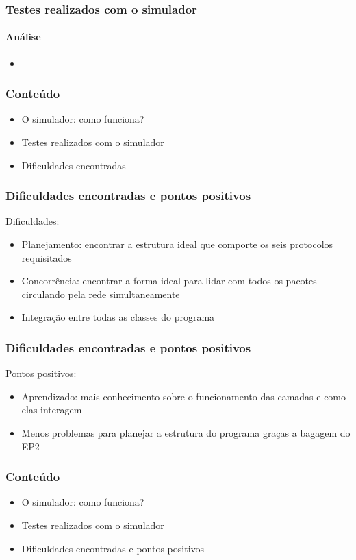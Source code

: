 \documentclass{beamer}
\begin{document}
\begin{frame}
	\frametitle{Testes realizados com o simulador}
	\framesubtitle{Análise}
	\begin{itemize}
		\item 
	\end{itemize}
\end{frame}

\begin{frame}
	\frametitle{Conteúdo}
	\begin{itemize}
		\item \textcolor{covered}{O simulador: como funciona?}
		\item \textcolor{covered}{Testes realizados com o simulador}
		\item Dificuldades encontradas
	\end{itemize}
\end{frame}

\begin{frame}
	\frametitle{Dificuldades encontradas e pontos positivos}
	Dificuldades:
	\begin{itemize}
		\item Planejamento: encontrar a estrutura ideal que comporte os seis protocolos requisitados
		\item Concorrência: encontrar a forma ideal para lidar com todos os pacotes circulando pela rede simultaneamente
		\item Integração entre todas as classes do programa
	\end{itemize}
\end{frame}

\begin{frame}
	\frametitle{Dificuldades encontradas e pontos positivos}
	Pontos positivos:
	\begin{itemize}
		\item Aprendizado: mais conhecimento sobre o funcionamento das camadas e como elas interagem
		\item Menos problemas para planejar a estrutura do programa graças a bagagem do EP2
	\end{itemize}
\end{frame}

\begin{frame}
	\frametitle{Conteúdo}
	\begin{itemize}
		\item \textcolor{covered}{O simulador: como funciona?}
		\item \textcolor{covered}{Testes realizados com o simulador}
		\item \textcolor{covered}{Dificuldades encontradas e pontos positivos}
	\end{itemize}
\end{frame}
\end{document}

